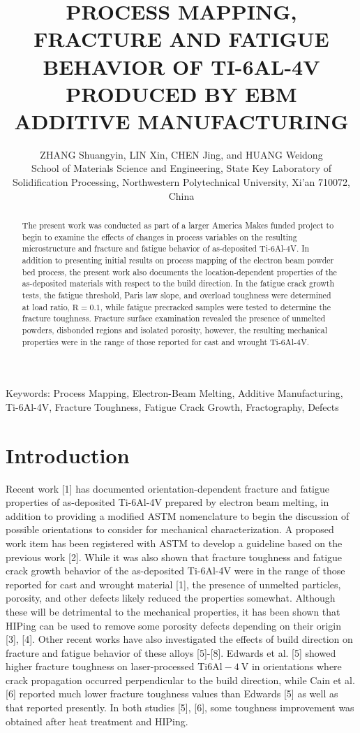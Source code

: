 \documentclass[10pt]{article}
\title{PROCESS MAPPING, FRACTURE AND FATIGUE BEHAVIOR OF TI-6AL-4V PRODUCED BY EBM ADDITIVE MANUFACTURING }
\author{ZHANG Shuangyin, LIN Xin, CHEN Jing, and HUANG Weidong\\
School of Materials Science and Engineering, State Key Laboratory of Solidification Processing, Northwestern Polytechnical University, Xi'an 710072, China}
\date{}
\begin{document}
\maketitle


\begin{abstract}
The present work was conducted as part of a larger America Makes funded project to begin to examine the effects of changes in process variables on the resulting microstructure and fracture and fatigue behavior of as-deposited Ti-6Al-4V. In addition to presenting initial results on process mapping of the electron beam powder bed process, the present work also documents the location-dependent properties of the as-deposited materials with respect to the build direction. In the fatigue crack growth tests, the fatigue threshold, Paris law slope, and overload toughness were determined at load ratio, $\mathrm{R}=0.1$, while fatigue precracked samples were tested to determine the fracture toughness. Fracture surface examination revealed the presence of unmelted powders, disbonded regions and isolated porosity, however, the resulting mechanical properties were in the range of those reported for cast and wrought Ti-6Al-4V.
\end{abstract}

Keywords: Process Mapping, Electron-Beam Melting, Additive Manufacturing, Ti-6Al-4V, Fracture Toughness, Fatigue Crack Growth, Fractography, Defects

\section*{Introduction}
Recent work [1] has documented orientation-dependent fracture and fatigue properties of as-deposited Ti-6Al-4V prepared by electron beam melting, in addition to providing a modified ASTM nomenclature to begin the discussion of possible orientations to consider for mechanical characterization. A proposed work item has been registered with ASTM to develop a guideline based on the previous work [2]. While it was also shown that fracture toughness and fatigue crack growth behavior of the as-deposited Ti-6Al-4V were in the range of those reported for cast and wrought material [1], the presence of unmelted particles, porosity, and other defects likely reduced the properties somewhat. Although these will be detrimental to the mechanical properties, it has been shown that HIPing can be used to remove some porosity defects depending on their origin [3], [4]. Other recent works have also investigated the effects of build direction on fracture and fatigue behavior of these alloys [5]-[8]. Edwards et al. [5] showed higher fracture toughness on laser-processed Ti$6 \mathrm{Al}-4 \mathrm{~V}$ in orientations where crack propagation occurred perpendicular to the build direction, while Cain et al. [6] reported much lower fracture toughness values than Edwards [5] as well as that reported presently. In both studies [5], [6], some toughness improvement was obtained after heat treatment and HIPing.
\end{document}
